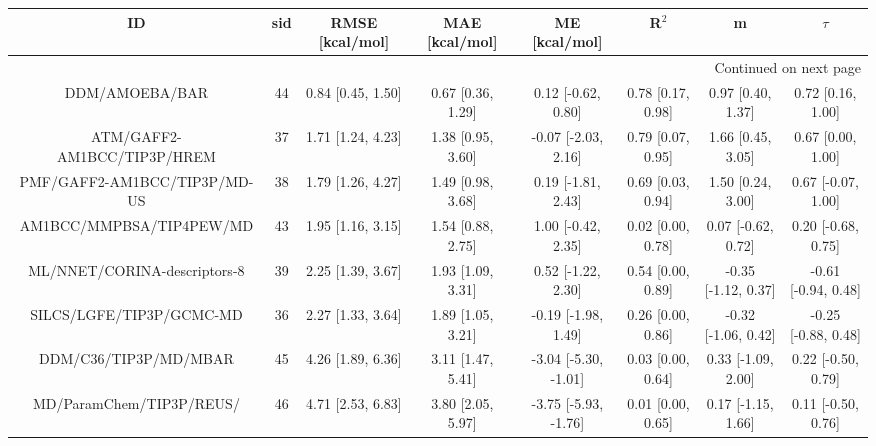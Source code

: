 \documentclass[8pt]{article}
\begin{document}
\begin{center}
\begin{footnotesize}
\begin{longtable}{|cccccccc|}
\toprule
                           ID & sid &    RMSE [kcal/mol] &     MAE [kcal/mol] &         ME [kcal/mol] &              R$^2$ &                    m &               $\tau$ \\
\midrule
\endhead
\midrule
\multicolumn{8}{r}{{Continued on next page}} \\
\midrule
\endfoot

\bottomrule
\endlastfoot
               DDM/AMOEBA/BAR &  44 &  0.84 [0.45, 1.50] &  0.67 [0.36, 1.29] &    0.12 [-0.62, 0.80] &  0.78 [0.17, 0.98] &    0.97 [0.40, 1.37] &    0.72 [0.16, 1.00] \\
  ATM/GAFF2-AM1BCC/TIP3P/HREM &  37 &  1.71 [1.24, 4.23] &  1.38 [0.95, 3.60] &   -0.07 [-2.03, 2.16] &  0.79 [0.07, 0.95] &    1.66 [0.45, 3.05] &    0.67 [0.00, 1.00] \\
 PMF/GAFF2-AM1BCC/TIP3P/MD-US &  38 &  1.79 [1.26, 4.27] &  1.49 [0.98, 3.68] &    0.19 [-1.81, 2.43] &  0.69 [0.03, 0.94] &    1.50 [0.24, 3.00] &   0.67 [-0.07, 1.00] \\
     AM1BCC/MMPBSA/TIP4PEW/MD &  43 &  1.95 [1.16, 3.15] &  1.54 [0.88, 2.75] &    1.00 [-0.42, 2.35] &  0.02 [0.00, 0.78] &   0.07 [-0.62, 0.72] &   0.20 [-0.68, 0.75] \\
 ML/NNET/CORINA-descriptors-8 &  39 &  2.25 [1.39, 3.67] &  1.93 [1.09, 3.31] &    0.52 [-1.22, 2.30] &  0.54 [0.00, 0.89] &  -0.35 [-1.12, 0.37] &  -0.61 [-0.94, 0.48] \\
     SILCS/LGFE/TIP3P/GCMC-MD &  36 &  2.27 [1.33, 3.64] &  1.89 [1.05, 3.21] &   -0.19 [-1.98, 1.49] &  0.26 [0.00, 0.86] &  -0.32 [-1.06, 0.42] &  -0.25 [-0.88, 0.48] \\
        DDM/C36/TIP3P/MD/MBAR &  45 &  4.26 [1.89, 6.36] &  3.11 [1.47, 5.41] &  -3.04 [-5.30, -1.01] &  0.03 [0.00, 0.64] &   0.33 [-1.09, 2.00] &   0.22 [-0.50, 0.79] \\
     MD/ParamChem/TIP3P/REUS/ &  46 &  4.71 [2.53, 6.83] &  3.80 [2.05, 5.97] &  -3.75 [-5.93, -1.76] &  0.01 [0.00, 0.65] &   0.17 [-1.15, 1.66] &   0.11 [-0.50, 0.76] \\
\end{longtable}
\end{footnotesize}
\end{center}
\end{document}
